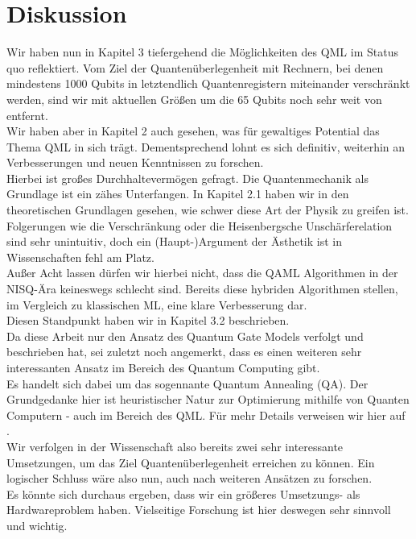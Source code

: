 \section{Diskussion}
\label{sec:disc}
Wir haben nun in Kapitel 3 tiefergehend die Möglichkeiten des QML im Status quo reflektiert. Vom Ziel der Quantenüberlegenheit mit Rechnern, bei denen mindestens 1000 Qubits in letztendlich Quantenregistern miteinander verschränkt werden, sind wir mit aktuellen Größen um die 65 Qubits noch sehr weit von entfernt.\\

Wir haben aber in Kapitel 2 auch gesehen, was für gewaltiges Potential das Thema QML in sich trägt. Dementsprechend lohnt es sich definitiv, weiterhin an Verbesserungen und neuen Kenntnissen zu forschen.\\
Hierbei ist großes Durchhaltevermögen gefragt. Die Quantenmechanik als Grundlage ist ein zähes Unterfangen. In Kapitel 2.1 haben wir in den theoretischen Grundlagen gesehen, wie schwer diese Art der Physik zu greifen ist. Folgerungen wie die Verschränkung oder die Heisenbergsche Unschärferelation sind sehr unintuitiv, doch ein (Haupt-)Argument der Ästhetik ist in Wissenschaften fehl am Platz.\\

Außer Acht lassen dürfen wir hierbei nicht, dass die QAML Algorithmen in der NISQ-Ära keineswegs schlecht sind. Bereits diese hybriden Algorithmen stellen, im Vergleich zu klassischen ML, eine klare Verbesserung dar.\\
Diesen Standpunkt haben wir in Kapitel 3.2 beschrieben.\\

Da diese Arbeit nur den Ansatz des Quantum Gate Models verfolgt und beschrieben hat, sei zuletzt noch angemerkt, dass es einen weiteren sehr interessanten Ansatz im Bereich des Quantum Computing gibt.\\
Es handelt sich dabei um das sogennante Quantum Annealing (QA). Der Grundgedanke hier ist heuristischer Natur zur Optimierung mithilfe von Quanten Computern - auch im Bereich des QML. Für mehr Details verweisen wir hier auf \cite{Annealing}.\\

Wir verfolgen in der Wissenschaft also bereits zwei sehr interessante Umsetzungen, um das Ziel Quantenüberlegenheit erreichen zu können. Ein logischer Schluss wäre also nun, auch nach weiteren Ansätzen zu forschen.\\
Es könnte sich durchaus ergeben, dass wir ein größeres Umsetzungs- als Hardwareproblem haben. Vielseitige Forschung ist hier deswegen sehr sinnvoll und wichtig.